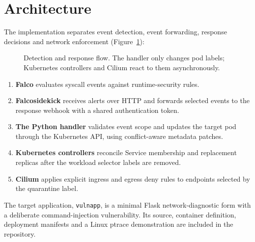 \section{Architecture}
The implementation separates event detection, event forwarding, response decisions
and network enforcement (Figure~\ref{fig:architecture}):
\begin{figure}[htbp]
\centering
{}
\caption{Detection and response flow. The handler only changes pod labels;
Kubernetes controllers and Cilium react to them asynchronously.}
\label{fig:architecture}
\end{figure}
\begin{enumerate}
\item \textbf{Falco} evaluates syscall events against runtime-security rules.
\item \textbf{Falcosidekick} receives alerts over HTTP and forwards selected events
to the response webhook with a shared authentication token.
\item \textbf{The Python handler} validates event scope and updates the target pod
through the Kubernetes API, using conflict-aware metadata patches.
\item \textbf{Kubernetes controllers} reconcile Service membership and replacement
replicas after the workload selector labels are removed.
\item \textbf{Cilium} applies explicit ingress and egress deny rules to endpoints
selected by the quarantine label.
\end{enumerate}
The target application, \texttt{vulnapp}, is a minimal Flask network-diagnostic form
with a deliberate command-injection vulnerability. Its source, container definition,
deployment manifests and a Linux ptrace demonstration are included in the repository.

